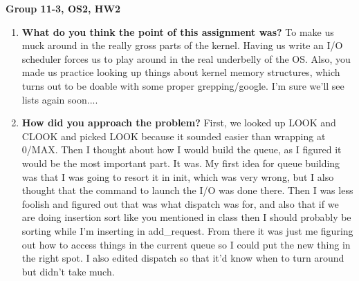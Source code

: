 \documentclass[IEEEtran,letterpaper,10pt,notitlepage,draftclsnofoot,onecolumn]{article}
\begin{document}
\textbf{Group 11-3, OS2, HW2}

\begin{enumerate}
\item 
\textbf{What do you think the point of this assignment was?}
To make us muck around in the really gross parts of the kernel. 
Having us write an I/O scheduler forces us to play around
in the real underbelly of the OS. Also, you made us practice
looking up things about kernel memory structures, which turns
out to be doable with some proper grepping/google. I'm sure
we'll see lists again soon....

\item 
\textbf{How did you approach the problem?}
First, we looked up LOOK and CLOOK and picked LOOK because
it sounded easier than wrapping at 0/MAX. Then I thought
about how I would build the queue, as I figured it would
be the most important part. It was. My first idea for 
queue building was that I was going to resort it in
init, which was very wrong, but I also thought that
the command to launch the I/O was done there. Then I 
was less foolish and figured out that was what dispatch 
was for, and also that if we are doing insertion sort like
you mentioned in class then I should probably be sorting
while I'm inserting in add\_request. From there it was just
me figuring out how to access things in the current queue
so I could put the new thing in the right spot.
I also edited dispatch so that it'd know when to turn around
but didn't take much.


\end{enumerate}
\end{document}
